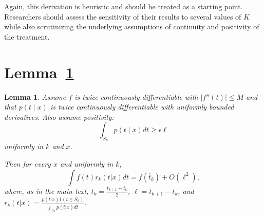 \documentclass[11pt]{article}
\newtheorem{lemma}{Lemma}
\begin{document}
Again, this derivation is heuristic and should be treated as a starting point. Researchers should assess the sensitivity of their results to several values of $K$ while also scrutinizing the underlying assumptions of continuity and positivity of the treatment.

\section{Lemma~\ref{lemma:midpoint}}

\label{app:midpoint}

\begin{lemma}
    \label{lemma:midpoint}
    Assume $f$ is twice continuously differentiable with $|f''(t)|\le M$ and that $p(t\mid x)$ is twice continuously differentiable with uniformly bounded derivatives. Also assume positivity:
    \[
    \int_{S_k}p(t\mid x)dt \ge \epsilon \ell
    \]
    uniformly in $k$ and $x$.

    Then for every $x$ and uniformly in $k$,
    \begin{equation}
        \int f(t) r_k (t|x) dt = f(\overline{t}_k) + O(\ell^2),
    \end{equation}
    where, as in the main text, $\overline{t}_k = \frac{t_{k+1} + t_k}{2}$, $\ell = t_{k + 1} - t_k$, and $r_k(t|x) = \frac{p(t|x) 1(t \in S_k)}{\int_{S_k} p(t|x)dt}.$
\end{lemma}
\end{document}
